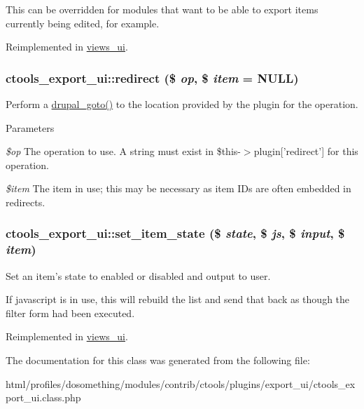 This can be overridden for modules that want to be able to export items currently being edited, for example. 

Reimplemented in \hyperlink{classviews__ui_a214105ecb1527a6ccf712fd6ec3f4c0c}{views\_\-ui}.\hypertarget{classctools__export__ui_a0265326b637899471198d0b7c260701d}{
\subsubsection[{redirect}]{\setlength{\rightskip}{0pt plus 5cm}ctools\_\-export\_\-ui::redirect (\$ {\em op}, \/  \$ {\em item} = {\ttfamily NULL})}}
\label{classctools__export__ui_a0265326b637899471198d0b7c260701d}
Perform a \hyperlink{group__http__handling_ga5b68d7a934713d1d623b2b32a732235d}{drupal\_\-goto()} to the location provided by the plugin for the operation.


\begin{DoxyParams}{Parameters}
\item[{\em \$op}]The operation to use. A string must exist in \$this-\/$>$plugin\mbox{[}'redirect'\mbox{]} for this operation. \item[{\em \$item}]The item in use; this may be necessary as item IDs are often embedded in redirects. \end{DoxyParams}
\hypertarget{classctools__export__ui_a60998d27b8d164122f1898a97a5666bf}{
\subsubsection[{set\_\-item\_\-state}]{\setlength{\rightskip}{0pt plus 5cm}ctools\_\-export\_\-ui::set\_\-item\_\-state (\$ {\em state}, \/  \$ {\em js}, \/  \$ {\em input}, \/  \$ {\em item})}}
\label{classctools__export__ui_a60998d27b8d164122f1898a97a5666bf}
Set an item's state to enabled or disabled and output to user.

If javascript is in use, this will rebuild the list and send that back as though the filter form had been executed. 

Reimplemented in \hyperlink{classviews__ui_afd2f31ed4d97d797f8cb6d11e658545e}{views\_\-ui}.

The documentation for this class was generated from the following file:\begin{DoxyCompactItemize}
\item 
html/profiles/dosomething/modules/contrib/ctools/plugins/export\_\-ui/ctools\_\-export\_\-ui.class.php\end{DoxyCompactItemize}

